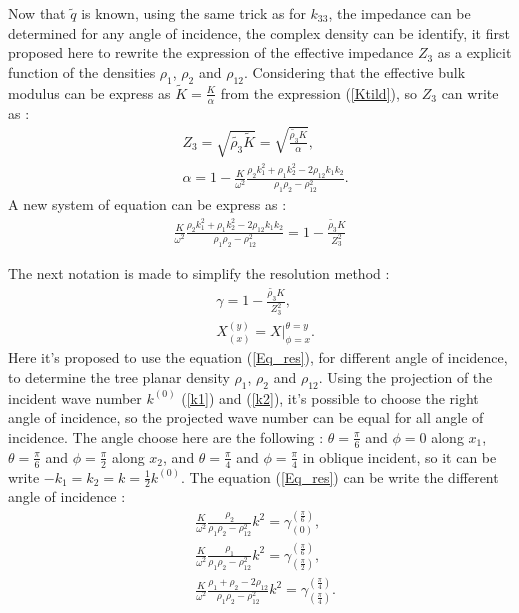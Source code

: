 \documentclass{article}
\begin{document}
    Now that $\tilde{q}$ is known, using the same trick as for $k_{33}$,  the impedance can be determined for any angle of incidence, the complex density can be identify, it first proposed here to rewrite the expression of the effective impedance $Z_3$ as a explicit function of the densities $\rho_1$, $\rho_2$ and $\rho_{12}$. Considering that the effective bulk modulus can be express as $\tilde{K}=\frac{K}{\alpha}$ from the expression (\ref{Ktild}), so $Z_3$ can write as :
    \begin{align}
        &Z_3=\sqrt{\tilde{\rho_3}\tilde{K}}=\sqrt{\frac{\tilde{\rho_3}K}{\alpha}},\\
        &\alpha=1-\frac{K}{\omega^2}\frac{\rho_2 k_1^2+\rho_1 k_2^2-2\rho_{12}k_1k_2}{\rho_1\rho_2-\rho_{12}^2}.
    \end{align}
    A new system of equation can be express as :
    \begin{align}
        \frac{K}{\omega^2}\frac{\rho_2k_1^2 +\rho_1k_2^2-2\rho_{12}k_1k_2}{\rho_1\rho_2-\rho_{12}^2}=1-\frac{\tilde{\rho_3}K}{Z_3^2}\label{Eq_res}
    \end{align}
    
    The next notation is made to simplify the resolution method :
    \begin{align}
        &\gamma=1-\frac{\tilde{\rho_3}K}{Z_3^2},\\
        &X_{(x)}^{(y)}=X|^{\theta=y}_{\phi=x}.
    \end{align}
    Here it's proposed to use the equation (\ref{Eq_res}), for different angle of incidence, to determine the tree planar density $\rho_1$, $\rho_2$ and $\rho_{12}$. Using the projection of the incident wave number $k^{(0)}$ (\ref{k1}) and (\ref{k2}), it's possible to choose the right angle of incidence, so the projected wave number can be equal for all angle of incidence. The angle choose here are the following : $\theta=\frac{\pi}{6}$ and $\phi=0$ along $x_1$, $\theta=\frac{\pi}{6}$ and $\phi=\frac{\pi}{2}$ along $x_2$, and $\theta=\frac{\pi}{4}$ and $\phi=\frac{\pi}{4}$ in oblique incident, so it can be write $-k_1=k_2=k=\frac{1}{2}k^{(0)}$.
    The equation (\ref{Eq_res}) can be write the different angle of incidence :
        \begin{align}
    &\frac{K}{\omega^2}\frac{\rho_2}{\rho_1\rho_2-\rho_{12}^2}k^2=\gamma^{(\frac{\pi}{6})}_{(0)}\label{Comp_1},\\ &\frac{K}{\omega^2}\frac{\rho_1}{\rho_1\rho_2-\rho_{12}^2}k^2=\gamma^{(\frac{\pi}{6})}_{(\frac{\pi}{2})}\label{Comp_2},\\ &\frac{K}{\omega^2}\frac{\rho_1+\rho_2-2\rho_{12}}{\rho_1\rho_2-\rho_{12}^2}k^2=\gamma^{(\frac{\pi}{4})}_{(\frac{\pi}{4})}\label{Comp_3}.
    \end{align}
    
\end{document}
